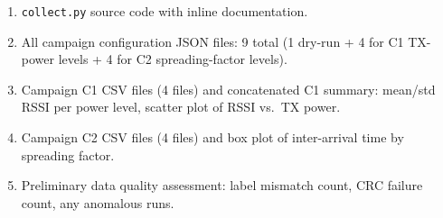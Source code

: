 \documentclass[11pt,letterpaper]{article}
\begin{document}
\begin{tcolorbox}[deliverable={Lab Handout 3-F Deliverable}]
	\begin{enumerate}[leftmargin=1.2em]
		\item \texttt{collect.py} source code with inline documentation.
		\item All campaign configuration JSON files: 9 total (1 dry-run + 4 for C1 TX-power levels + 4 for C2 spreading-factor levels).
		\item Campaign C1 CSV files (4 files) and concatenated C1 summary: mean/std \mbox{RSSI} per power level, scatter plot of \mbox{RSSI} vs.\ \mbox{TX} power.
		\item Campaign C2 CSV files (4 files) and box plot of inter-arrival time by spreading factor.
		\item Preliminary data quality assessment: label mismatch count, \mbox{CRC} failure count, any anomalous runs.
	\end{enumerate}
\end{tcolorbox}

\printhandoutglossary
\end{document}
